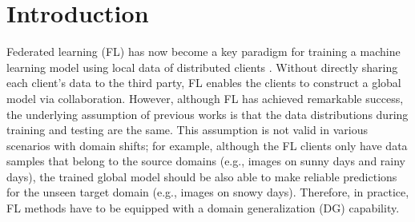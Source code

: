 \documentclass{article}
\theoremstyle{plain}
\theoremstyle{definition}
\theoremstyle{remark}
\begin{document}
\begin{abstract}

\end{abstract}


\section{Introduction}

Federated learning (FL) has now become a key paradigm for training a machine learning model using local data of distributed clients \cite{mcmahan2017communication, li2020federated_survey, kairouz2021advances}. Without directly sharing each client's data to the third party, FL enables the clients to construct  a global  model  via collaboration. However, although FL has achieved remarkable success, the underlying assumption of previous works is that the data distributions during training and testing   are the same. This assumption is not valid in various  scenarios with domain shifts; for example, although the FL clients only have data samples that belong to the source domains (e.g., images on sunny days and rainy days), the trained  global model should  be also able to make reliable predictions for the unseen target domain (e.g., images on snowy days). Therefore,  in practice, FL methods have to be equipped with a domain generalization (DG) capability.    
\end{document}
